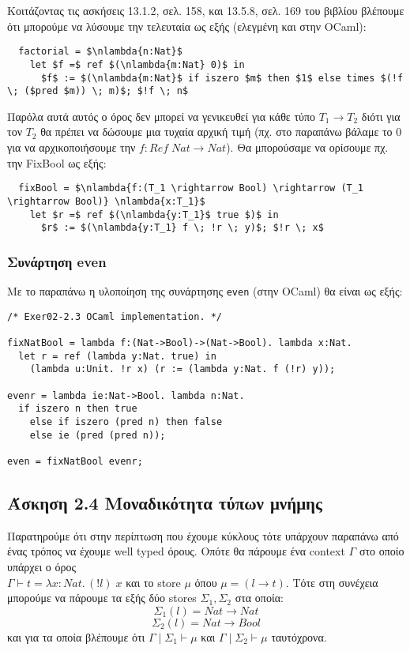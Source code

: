 \documentclass[a4paper,11pt]{article}
\newcommand\nlambda[1]{\ensuremath{\lambda #1.\,}}
\begin{document}
Κοιτάζοντας τις ασκήσεις 13.1.2, σελ. 158, και 13.5.8, σελ. 169 του βιβλίου βλέπουμε ότι μπορούμε να λύσουμε την τελευταία ως εξής (ελεγμένη και στην OCaml):
\begin{lstlisting}
  factorial = $\nlambda{n:Nat}$
    let $f =$ ref $(\nlambda{m:Nat} 0)$ in
      $f$ := $(\nlambda{m:Nat}$ if iszero $m$ then $1$ else times $(!f \; ($pred $m)) \; m)$; $!f \; n$
\end{lstlisting}
Παρόλα αυτά αυτός ο όρος δεν μπορεί να γενικευθεί για κάθε τύπο $T_1 \rightarrow T_2$ διότι για τον $T_2$ θα πρέπει να δώσουμε μια τυχαία αρχική τιμή (πχ. στο παραπάνω βάλαμε το $0$ για να αρχικοποιήσουμε την $f:Ref \; Nat \rightarrow Nat$).
Θα μπορούσαμε να ορίσουμε πχ. την FixBool ως εξής:
\begin{lstlisting}
  fixBool = $\nlambda{f:(T_1 \rightarrow Bool) \rightarrow (T_1 \rightarrow Bool)} \nlambda{x:T_1}$
    let $r =$ ref $(\nlambda{y:T_1}$ true $)$ in
      $r$ := $(\nlambda{y:T_1} f \; !r \; y)$; $!r \; x$
\end{lstlisting}

\subsubsection*{Συνάρτηση even}

Με το παραπάνω η υλοποίηση της συνάρτησης \verb|even| (στην OCaml) θα είναι ως εξής:
\begin{verbatim}
/* Exer02-2.3 OCaml implementation. */

fixNatBool = lambda f:(Nat->Bool)->(Nat->Bool). lambda x:Nat.
  let r = ref (lambda y:Nat. true) in
    (lambda u:Unit. !r x) (r := (lambda y:Nat. f (!r) y));

evenr = lambda ie:Nat->Bool. lambda n:Nat.
  if iszero n then true
    else if iszero (pred n) then false
    else ie (pred (pred n));

even = fixNatBool evenr;
\end{verbatim}

\subsection*{Άσκηση 2.4  Μοναδικότητα τύπων μνήμης}

Παρατηρούμε ότι στην περίπτωση που έχουμε κύκλους τότε υπάρχουν παραπάνω από ένας τρόπος να έχουμε well typed όρους.
Οπότε θα πάρουμε ένα context $\Gamma$ στο οποίο υπάρχει ο όρος \\ $\Gamma \vdash t = \nlambda{x:Nat} (!l) \; x$ και το store $\mu$ όπου $\mu = (l \rightarrow t)$.
Τότε στη συνέχεια μπορούμε να πάρουμε τα εξής δύο stores $\Sigma_1, \Sigma_2$ στα οποία:
\[ \Sigma_1(l) = Nat \rightarrow Nat \]
\[ \Sigma_2(l) = Nat \rightarrow Bool \]
και για τα οποία βλέπουμε ότι $\Gamma \; | \; \Sigma_1 \vdash \mu$ και $\Gamma \; | \; \Sigma_2 \vdash \mu$ ταυτόχρονα.
\end{document}
